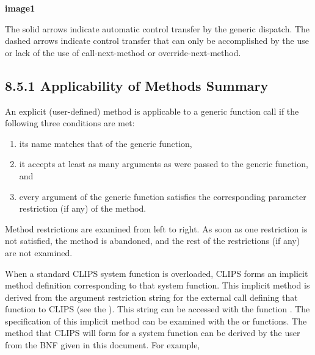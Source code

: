 \documentclass[letterpaper,10pt,english]{sphinxmanual}
\begin{document}
{\color{red}\bfseries{}\textbar{}image1\textbar{}}

The solid arrows indicate automatic control transfer by the generic
dispatch. The dashed arrows indicate control transfer that can only be
accomplished by the use or lack of the use of call-next-method or
override-next-method.


\subsection{8.5.1 Applicability of Methods Summary}
\label{\detokenize{generic:applicability-of-methods-summary}}
An explicit (user-defined) method is applicable to a generic function
call if the following three conditions are met:
\begin{enumerate}
\def\theenumi{\arabic{enumi}}
\def\labelenumi{\theenumi .}
\makeatletter\def\p@enumii{\p@enumi \theenumi .}\makeatother
\item {} 
its name matches that of the generic function,

\item {} 
it accepts at least as many arguments as were passed to the generic
function, and

\item {} 
every argument of the generic function satisfies the corresponding
parameter restriction (if any) of the method.

\end{enumerate}

Method restrictions are examined from left to right. As soon as one
restriction is not satisfied, the method is abandoned, and the rest of
the restrictions (if any) are not examined.

When a standard CLIPS system function is overloaded, CLIPS forms an
implicit method definition corresponding to that system function. This
implicit method is derived from the argument restriction string for the
external  call defining that function to CLIPS (see
the ). This string can be accessed with the
function . The specification of this
implicit method can be examined with the  or
 functions. The method that CLIPS will form
for a system function can be derived by the user from the BNF given in
this document. For example,

\begin{sphinxVerbatim}[commandchars=\\\{\}]
  
\end{sphinxVerbatim}
\end{document}
